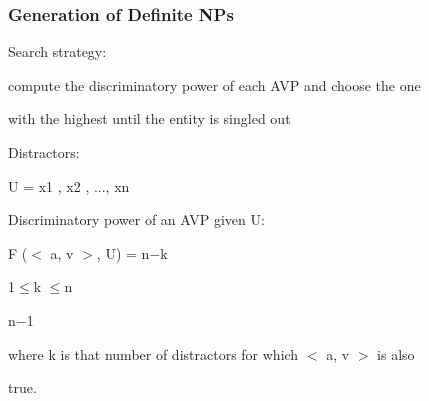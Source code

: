 \documentclass[compress,color=usenames]{beamer}
\begin{document}
\begin{frame}
\frametitle{
Generation of Deﬁnite NPs}






Search strategy:



compute the discriminatory power of each AVP and choose the one



with the highest until the entity is singled out



Distractors:



U = x1 , x2 , ..., xn



Discriminatory power of an AVP given U:



F ($<$ a, v $>$, U) = n$-$k



1$\leq$k $\leq$n



n$-$1



where k is that number of distractors for which $<$ a, v $>$ is also



true.










\end{frame}
\end{document}
